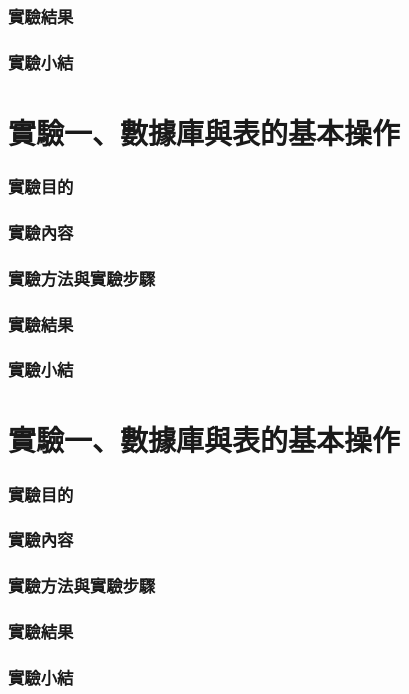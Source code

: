 \documentclass[12pt, a4paper]{report}
\begin{document}
\section{實驗結果}

\section{實驗小結}

\part{實驗一、數據庫與表的基本操作}

\section{實驗目的}



\section{實驗內容}

\section{實驗方法與實驗步驟}

\section{實驗結果}

\section{實驗小結}

\part{實驗一、數據庫與表的基本操作}

\section{實驗目的}



\section{實驗內容}

\section{實驗方法與實驗步驟}

\section{實驗結果}

\section{實驗小結}
\end{document}
